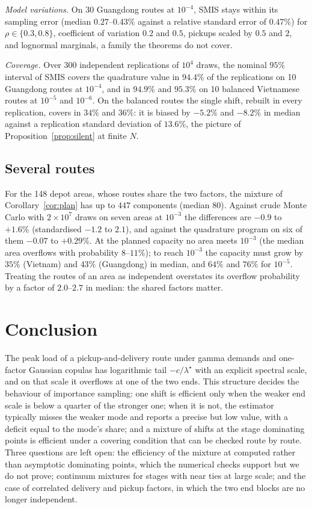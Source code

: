 \documentclass[pdflatex,sn-mathphys-ay]{sn-jnl}%
\theoremstyle{thmstyleone}%
\theoremstyle{thmstylethree}%
\theoremstyle{thmstyletwo}%
\begin{document}
\emph{Model variations.} On 30 Guangdong routes at $10^{-4}$, SMIS stays within its
sampling error (median $0.27$--$0.43\%$ against a relative standard error of $0.47\%$)
for $\rho\in\{0.3,0.8\}$, coefficient of variation $0.2$ and $0.5$, pickups scaled by
$0.5$ and $2$, and lognormal marginals, a family the theorems do not cover.

\emph{Coverage.} Over 300 independent replications of $10^4$ draws, the nominal $95\%$
interval of SMIS covers the quadrature value in $94.4\%$ of the replications on 10
Guangdong routes at $10^{-4}$, and in $94.9\%$ and $95.3\%$ on 10 balanced Vietnamese
routes at $10^{-5}$ and $10^{-6}$. On the balanced routes the single shift, rebuilt in
every replication, covers in $34\%$ and $36\%$: it is biased by $-5.2\%$ and $-8.2\%$ in
median against a replication standard deviation of $13.6\%$, the picture of
Proposition~\ref{prop:silent} at finite $N$.

\subsection{Several routes}
For the 148 depot areas, whose routes share the two factors, the mixture of
Corollary~\ref{cor:plan} has up to $447$ components (median $80$). Against crude Monte
Carlo with $2\times10^7$ draws on seven areas at $10^{-3}$ the differences are $-0.9$ to
$+1.6\%$ (standardised $-1.2$ to $2.1$), and against the quadrature program on six of them
$-0.07$ to $+0.29\%$. At the planned capacity no area meets $10^{-3}$ (the median area
overflows with probability $8$--$11\%$); to reach $10^{-3}$ the capacity must grow by
$35\%$ (Vietnam) and $43\%$ (Guangdong) in median, and $64\%$ and $76\%$ for $10^{-5}$.
Treating the routes of an area as independent overstates its overflow probability by a
factor of $2.0$--$2.7$ in median: the shared factors matter.

\section{Conclusion}
\label{sec:conclusion}

The peak load of a pickup-and-delivery route under gamma demands and one-factor Gaussian
copulas has logarithmic tail $-c/\lambda^\star$ with an explicit spectral scale, and on
that scale it overflows at one of the two ends. This structure decides the behaviour of
importance sampling: one shift is efficient only when the weaker end scale is below a
quarter of the stronger one; when it is not, the estimator typically misses the weaker
mode and reports a precise but low value, with a deficit equal to the mode's share; and
a mixture of shifts at the stage dominating points is efficient under a covering
condition that can be checked route by route. Three questions are left open: the
efficiency of the mixture at computed rather than asymptotic dominating points, which
the numerical checks support but we do not prove; continuum mixtures for stages with
near ties at large scale; and the case of correlated delivery and pickup factors, in
which the two end blocks are no longer independent.
\end{document}
